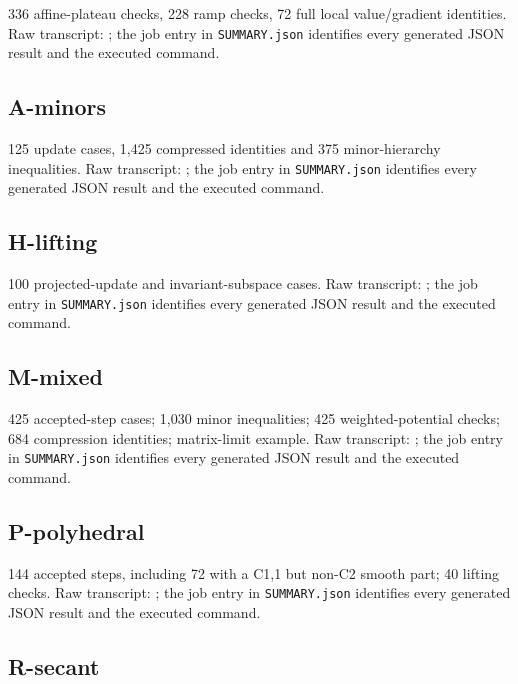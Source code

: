 336 affine-plateau checks, 228 ramp checks, 72 full local value/gradient identities. Raw transcript: ; the job entry in \texttt{SUMMARY.json} identifies every generated JSON result and the executed command.

\subsection{A-minors}\label{a-minors}

125 update cases, 1,425 compressed identities and 375 minor-hierarchy inequalities. Raw transcript: ; the job entry in \texttt{SUMMARY.json} identifies every generated JSON result and the executed command.

\subsection{H-lifting}\label{h-lifting}

100 projected-update and invariant-subspace cases. Raw transcript: ; the job entry in \texttt{SUMMARY.json} identifies every generated JSON result and the executed command.

\subsection{M-mixed}\label{m-mixed}

425 accepted-step cases; 1,030 minor inequalities; 425 weighted-potential checks; 684 compression identities; matrix-limit example. Raw transcript: ; the job entry in \texttt{SUMMARY.json} identifies every generated JSON result and the executed command.

\subsection{P-polyhedral}\label{p-polyhedral}

144 accepted steps, including 72 with a C1,1 but non-C2 smooth part; 40 lifting checks. Raw transcript: ; the job entry in \texttt{SUMMARY.json} identifies every generated JSON result and the executed command.

\subsection{R-secant}\label{r-secant}

